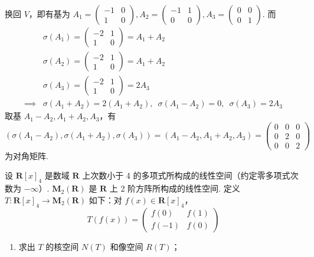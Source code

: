 \begin{exercise}
\begin{exgroup}
\begin{answer}
          换回 $ V $，即有基为 $ A_1 = \begin{pmatrix} -1 & 0 \\ 1 & 0 \end{pmatrix}, A_2 = \begin{pmatrix} -1 & 1 \\ 0 & 0 \end{pmatrix}, A_3 = \begin{pmatrix} 0 & 0 \\ 0 & 1 \end{pmatrix} $. 而
          \begin{align*}
                         & \sigma(A_1) = \begin{pmatrix} -2 & 1 \\ 1 & 0 \end{pmatrix} = A_1 + A_2                      \\
                         & \sigma(A_2) = \begin{pmatrix} -2 & 1 \\ 1 & 0 \end{pmatrix} = A_1 + A_2                      \\
                         & \sigma(A_3) = \begin{pmatrix} -2 & 1 \\ 1 & 0 \end{pmatrix} = 2 A_3                          \\
              \implies{} & \sigma(A_1 + A_2) = 2(A_1 + A_2),\enspace \sigma(A_1 - A_2) = 0,\enspace \sigma(A_3) = 2 A_3
          \end{align*}
          取基 $ A_1 - A_2, A_1 + A_2, A_3 $，有
          \[ (\sigma(A_1 - A_2), \sigma(A_1 + A_2), \sigma(A_3)) = (A_1 - A_2, A_1 + A_2, A_3) = \begin{pmatrix}
                  0 & 0 & 0 \\
                  0 & 2 & 0 \\
                  0 & 0 & 2
              \end{pmatrix} \]
          为对角矩阵.
        \end{answer}

        \item 设 $\mathbf{R}[x]_4$ 是数域 $\mathbf{R}$ 上次数小于 4 的多项式所构成的线性空间（约定零多项式次数为 $-\infty$）. $\mathbf{M}_2(\mathbf{R})$ 是 $\mathbf{R}$ 上 2 阶方阵所构成的线性空间. 定义 $T \colon \mathbf{R}[x]_4 \to \mathbf{M}_2(\mathbf{R})$ 如下：对 $f(x) \in \mathbf{R}[x]_4$，
        \[T(f(x))=\begin{pmatrix}f(0) & f(1) \\ f(-1) & f(0)\end{pmatrix}\]
        \begin{enumerate}
            \item 求出 $T$ 的核空间 $N(T)$ 和像空间 $R(T)$；


\end{enumerate}
\end{exgroup}
\end{exercise}
